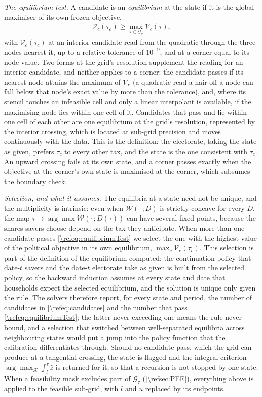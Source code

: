\emph{The equilibrium test.} A candidate is an \emph{equilibrium} at the state if it is the global maximiser of its own frozen objective,
\begin{align}\label{\refeq:equilibriumTest}
    \mathcal{V}_c(\tau_c) \geq \max_{\tau\in\mathcal{G}_{\tau}}\mathcal{V}_c(\tau),
\end{align}
with $\mathcal{V}_c(\tau_c)$ at an interior candidate read from the quadratic through the three nodes nearest it, up to a relative tolerance of $10^{-9}$, and at a corner equal to its node value. Two forms at the grid's resolution supplement the reading for an interior candidate, and neither applies to a corner: the candidate passes if its nearest node attains the maximum of $\mathcal{V}_c$ (a quadratic read a hair off a node can fall below that node's exact value by more than the tolerance), and, where its stencil touches an infeasible cell and only a linear interpolant is available, if the maximising node lies within one cell of it. Candidates that pass and lie within one cell of each other are one equilibrium at the grid's resolution, represented by the interior crossing, which is located at sub-grid precision and moves continuously with the data. This is the definition: the electorate, taking the state as given, prefers $\tau_c$ to every other tax, and the state is the one consistent with $\tau_c$. An upward crossing fails at its own state, and a corner passes exactly when the objective at the corner's own state is maximised at the corner, which subsumes the boundary check.

\emph{Selection, and what it assumes.} The equilibria at a state need not be unique, and the multiplicity is intrinsic: even when $\mathcal{W}(\cdot\,;D)$ is strictly concave for every $D$, the map $\tau\mapsto\arg\max\mathcal{W}(\cdot\,;D(\tau))$ can have several fixed points, because the shares savers choose depend on the tax they anticipate. When more than one candidate passes \eqref{\refeq:equilibriumTest} we select the one with the highest value of the political objective in its own equilibrium, $\max_c \mathcal{V}_c(\tau_c)$. This selection is part of the definition of the equilibrium computed: the continuation policy that date-$t$ savers and the date-$t$ electorate take as given is built from the selected policy, so the backward induction assumes at every state and date that households expect the selected equilibrium, and the solution is unique only given the rule. The solvers therefore report, for every state and period, the number of candidates in \eqref{\refeq:candidates} and the number that pass \eqref{\refeq:equilibriumTest}; the latter never exceeding one means the rule never bound, and a selection that switched between well-separated equilibria across neighbouring states would put a jump into the policy function that the calibration differentiates through. Should no candidate pass, which the grid can produce at a tangential crossing, the state is flagged and the integral criterion $\arg\max_{\mathcal{K}}\int_l^{\tau}\hat{z}$ is returned for it, so that a recursion is not stopped by one state. When a feasibility mask excludes part of $\mathcal{G}_{\tau}$ (\cref{\refsec:PEE}), everything above is applied to the feasible sub-grid, with $l$ and $u$ replaced by its endpoints.

